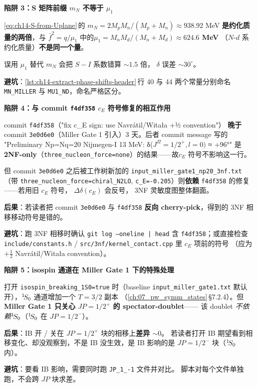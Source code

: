 \begin{pitfallbox}[label={box:ch14-pitfall-mN-vs-mu}]
\textbf{陷阱 3：S 矩阵前缀 \(m_N\) 不等于 \(\mu_1\)}

\cref{eq:ch14-S-from-Uplane}\(\,\)的 \(m_N = 2 M_p M_n / (M_p+M_n) \approx 938.92\)
MeV \textbf{是约化质量的两倍}，与
\(\bar{f}^2 = q/\mu_1\) 中的\textbf{\(\mu_1 = M_n M_d /(M_n+M_d) \approx 624.6\) MeV}
（\(N\)-\(d\) 系约化质量）\textbf{不是同一个量}。

误用 \(\mu_1\) 替代 \(m_N\) 会把 \(S - I\) 系数错算 \(\sim 1.5\) 倍，
\(\delta\) 误差 \(\sim 30^\circ\)。

\textbf{避坑}：\cref{lst:ch14-extract-phase-shifts-header}\(\,\)行 40 与 44
两个常量分别命名 \texttt{MN\_MILLER} 与 \texttt{MU1\_ND}，命名严格区分。
\end{pitfallbox}

\begin{pitfallbox}[label={box:ch14-pitfall-cE-sign}]
\textbf{陷阱 4：与 commit \texttt{f4df358} \(c_E\) 符号修复的相互作用}

commit \texttt{f4df358}（"fix c\_E sign: use Navrátil/Witała +½ convention"）
\textbf{晚于}commit \texttt{3e0d6e0}（Miller Gate 1 引入）3 天。后者 commit message 写的
"Preliminary Np=Nq=20 Nijmegen-I 13 MeV: δ(\(J^\Pi=1/2^+, l=0)\) ≈ +96°"
是\textbf{2NF-only}（\texttt{three\_nucleon\_force=none}）的结果——故\(c_E\)
符号不影响这一行。

但 commit \texttt{3e0d6e0} 之后被工作树新加的 \texttt{input\_miller\_gate1\_np20\_3nf.txt}
（带 \texttt{three\_nucleon\_force=chiral\_N2LO}, \texttt{c\_E=-0.205}）则\textbf{依赖}
\texttt{f4df358} 的修复——若用旧 \(c_E\) 符号，
\(\Delta\delta(c_E)\) 会反号，
3NF 灵敏度图整体翻面。

\textbf{后果}：若读者把 commit \texttt{3e0d6e0} 与 \texttt{f4df358}
\textbf{反向 cherry-pick}，得到的 3NF 相移移动符号是错的。

\textbf{避坑}：跑 3NF 相移时确认 \texttt{git log --oneline | head} 含
\texttt{f4df358}；或直接检查 \texttt{include/constants.h} /
\texttt{src/3nf/kernel\_contact.cpp} 里 \(c_E\) 项前的符号
（应为 \(+\tfrac{1}{2}\) Navrátil/Witała convention）。
\end{pitfallbox}

\begin{pitfallbox}[label={box:ch14-pitfall-isospin-channels}]
\textbf{陷阱 5：isospin 通道在 Miller Gate 1 下的特殊处理}

打开 \texttt{isospin\_breaking\_1S0=true} 时（baseline \texttt{input\_miller\_gate1.txt}
默认开），\({}^{1}\!S_{0}\) 通道增加一个 \(T = 3/2\) 副本
（\cref{ch:07_pw_symm_states}\(\,\)\S 7.2.4）。但
\textbf{Miller Gate 1 只关心 \(JP = 1/2^+\) 的 spectator-doublet}——
该 doublet \emph{不依赖}\({}^{1}\!S_{0}\)（\({}^{1}\!S_{0}\) 在
\(JP = 1/2^-\)）。

\textbf{后果}：IB 开 / 关在 \(JP = 1/2^+\) 块的相移上\textbf{差异 \(\sim 0\)}。
若读者打开 IB 期望看到相移变化、却没观察到，不是 IB 没生效，是 IB 影响的是
\(JP = 1/2^-\) 块（\({}^{1}\!S_{0}\) 内）。

\textbf{避坑}：要看 IB 影响，需要同时跑 \texttt{JP\_1\_-1} 文件并对比。
脚本对每个文件单独跑，不会跨 \(JP\) 块求差。
\end{pitfallbox}

